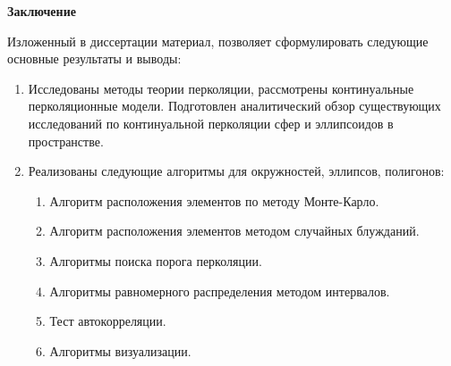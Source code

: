 \begin{center}
\LARGE\bf{Заключение}
\end{center}

Изложенный в диссертации материал, позволяет сформулировать
следующие основные результаты и выводы: 
\begin{enumerate}
    \item Исследованы методы теории перколяции, рассмотрены континуальные перколяционные модели. Подготовлен аналитический обзор существующих исследований по континуальной перколяции сфер и эллипсоидов в пространстве.
    \item Реализованы следующие алгоритмы для окружностей, эллипсов, полигонов: 
    \begin{enumerate}
        \item Алгоритм расположения элементов по методу Монте-Карло.
        \item Алгоритм расположения элементов методом случайных блужданий.
        \item Алгоритмы поиска порога перколяции.
        \item Алгоритмы равномерного распределения методом интервалов.
        \item Тест автокорреляции.
        \item Алгоритмы визуализации.
    \end{enumerate}
\end{enumerate}